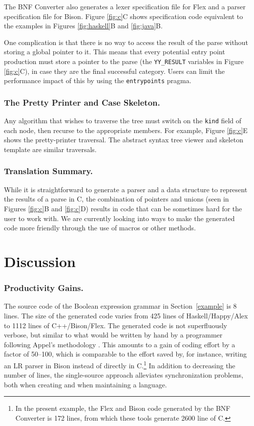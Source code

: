 \documentclass{llncs}
\newcommand{\shortsection}[1]{\subsubsection*{#1.}} %
\begin{document}
The BNF Converter also generates a lexer specification file for Flex and a parser specification file for Bison. Figure \ref{fig:c}C shows specification code equivalent to the examples in Figures \ref{fig:haskell}B and \ref{fig:java}B.

One complication is that there is no way to access the result of the parse without storing a global pointer to it. This means that every potential entry point production must store a pointer to the parse (the \texttt{YY\_RESULT} variables in Figure \ref{fig:c}C),
in case they are the final successful category. Users can limit the performance impact of this by using the \texttt{entrypoints} pragma.

\shortsection{The Pretty Printer and Case Skeleton}

Any algorithm that wishes to traverse the tree must switch on the \texttt{kind} field of each node, then recurse to the appropriate members. For example, Figure \ref{fig:c}E shows the pretty-printer traversal. The abstract syntax tree viewer and skeleton template are similar traversals.

\shortsection{Translation Summary}

While it is straightforward to generate a parser and a data structure to represent the results of a parse in C, the combination of pointers and unions (seen in Figures \ref{fig:c}B and \ref{fig:c}D) results in code that can be sometimes hard for the user to work with. We are currently looking into ways to make the generated code more friendly through the use of macros or other methods.

\section{Discussion}

\shortsection{Productivity Gains}

The source code of the Boolean expression grammar in Section~\ref{example} is
8 lines. The size of the generated code varies from 425 lines of 
Haskell/Happy/Alex to 
1112 lines of C++/Bison/Flex. The generated code is not superfluously verbose, but
similar to what would be written by hand by a programmer following
Appel's methodology \cite{AppelC,AppelJ,appel}. 
This amounts to a gain of coding effort by
a factor of 50--100, which is comparable to the effort saved by,
for instance, writing an LR parser in Bison instead of directly in C.\footnote{
In the present example, the Flex and Bison code generated by the BNF Converter 
is 172 lines, from which these tools generate 2600 line of C.
}
In addition to decreasing the number of lines, the single-source
approach alleviates synchronization problems, both when creating and 
when maintaining a language.
\end{document}
